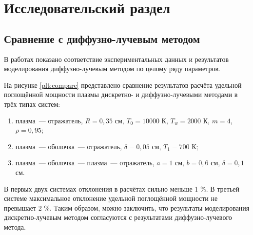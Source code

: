 
\chapter{Исследовательский раздел}

\section{Сравнение с диффузно-лучевым методом}

В работах \cite{gradov-calculation-methods, gradov-machine-modeling} показано соответствие экспериментальных данных и результатов моделирования диффузно-лучевым методом \cite{gradov-dissertation} по целому ряду параметров.

На рисунке \ref{plt:compare} представлено сравнение результатов расчёта удельной поглощённой мощности плазмы дискретно- и диффузно-лучевыми методами в трёх типах систем:
\begin{enumerate}
	\item плазма~— отражатель, $R = 0,35$ см, $T_0 = 10000$ К, $T_w = 2000$ К, $m = 4$, $\rho = 0,95$;
	\item плазма~— оболочка~— отражатель, $\delta = 0,05$ см, $T_1 = 700$ К;
	\item плазма~— оболочка~— плазма~— отражатель, $a = 1$ см, $b = 0,6$ см, $\delta = 0,1$ см.
\end{enumerate}

\noindent В первых двух системах отклонения в расчётах сильно меньше 1 \%.
В третьей системе максимальное отклонение удельной поглощённой мощности не превышает 2 \%.
Таким образом, можно заключить, что результаты моделирования дискретно-лучевым методом согласуются с результатами диффузно-лучевого метода.

